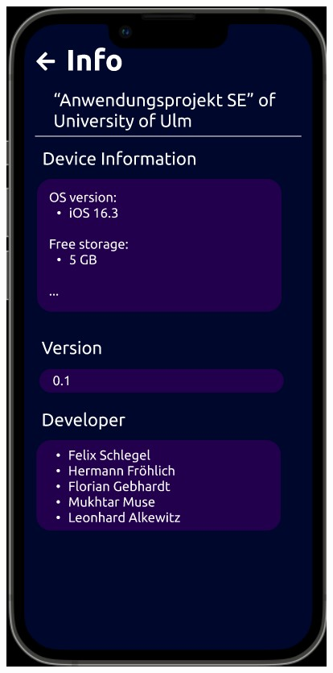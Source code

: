 \documentclass[12pt]{article}
\begin{document}
\begin{itemize}
\begin{minipage}[t]{0.3\textwidth}
        \includegraphics[width=\textwidth]{info.jpg}
    \end{minipage}
   


\end{itemize}
\end{document}
